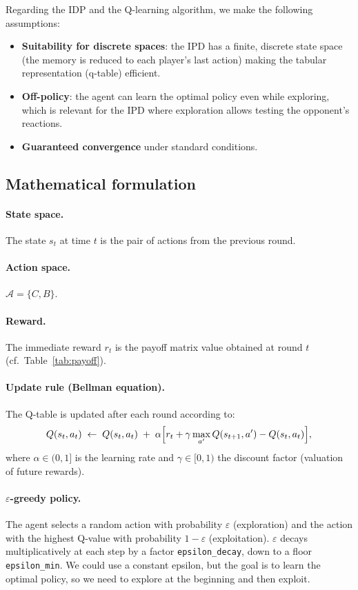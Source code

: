 \documentclass[11pt, a4paper]{article}
\begin{document}
Regarding the IDP and the Q-learning algorithm, we make the following assumptions:
\begin{itemize}
  \item \textbf{Suitability for discrete spaces}: the IPD has a finite, discrete state space (the memory is reduced to each player's last action) making the tabular representation (q-table) efficient.
  \item \textbf{Off-policy}: the agent can learn the optimal policy even while exploring, which is relevant for the IPD where exploration allows testing the opponent's reactions.
  \item \textbf{Guaranteed convergence} under standard conditions.
\end{itemize}

\subsection{Mathematical formulation}

\paragraph{State space.}
The state $s_t$ at time $t$ is the pair of actions from the previous round.

\paragraph{Action space.}
$\mathcal{A} = \{C, B\}$.

\paragraph{Reward.}
The immediate reward $r_t$ is the payoff matrix value obtained at round $t$ (cf.\ Table~\ref{tab:payoff}).

\paragraph{Update rule (Bellman equation).}
The Q-table is updated after each round according to:
\begin{equation}
  Q(s_t, a_t) \;\leftarrow\; Q(s_t, a_t) \;+\; \alpha \Bigl[r_t + \gamma \max_{a'} Q(s_{t+1}, a') - Q(s_t, a_t)\Bigr],
  \label{eq:bellman}
\end{equation}
where $\alpha \in (0,1]$ is the learning rate and $\gamma \in [0,1)$ the discount factor (valuation of future rewards).

\paragraph{$\varepsilon$-greedy policy.}
The agent selects a random action with probability $\varepsilon$ (exploration) and the action with the highest Q-value with probability $1 - \varepsilon$ (exploitation). $\varepsilon$ decays multiplicatively at each step by a factor \texttt{epsilon\_decay}, down to a floor \texttt{epsilon\_min}.
We could use a constant epsilon, but the goal is to learn the optimal policy, so we need to explore at the beginning and then exploit.
\end{document}
